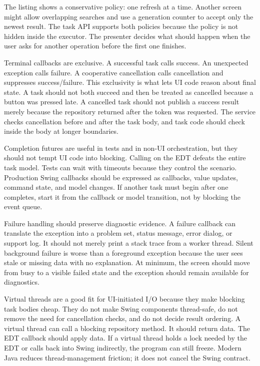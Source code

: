 The listing shows a conservative policy: one refresh at a time. Another screen
might allow overlapping searches and use a generation counter to accept only
the newest result. The task API supports both policies because the policy is
not hidden inside the executor. The presenter decides what should happen when
the user asks for another operation before the first one finishes.

Terminal callbacks are exclusive. A successful task calls success. An
unexpected exception calls failure. A cooperative cancellation calls
cancellation and suppresses success/failure. This exclusivity is what lets UI
code reason about final state. A task should not both succeed and then be
treated as cancelled because a button was pressed late. A cancelled task should
not publish a success result merely because the repository returned after the
token was requested. The service checks cancellation before and after the task
body, and task code should check inside the body at longer boundaries.

Completion futures are useful in tests and in non-UI orchestration, but they
should not tempt UI code into blocking. Calling  on the
EDT defeats the entire task model. Tests can wait with timeouts because they
control the scenario. Production Swing callbacks should be expressed as
callbacks, value updates, command state, and model changes. If another task
must begin after one completes, start it from the callback or model transition,
not by blocking the event queue.

Failure handling should preserve diagnostic evidence. A failure callback can
translate the exception into a problem set, status message, error dialog, or
support log. It should not merely print a stack trace from a worker thread.
Silent background failure is worse than a foreground exception because the
user sees stale or missing data with no explanation. At minimum, the screen
should move from busy to a visible failed state and the exception should remain
available for diagnostics.

Virtual threads are a good fit for UI-initiated I/O because they make blocking
task bodies cheap. They do not make Swing components thread-safe, do not remove
the need for cancellation checks, and do not decide result ordering. A virtual
thread can call a blocking repository method. It should return data. The EDT
callback should apply data. If a virtual thread holds a lock needed by the EDT
or calls back into Swing indirectly, the program can still freeze. Modern Java
reduces thread-management friction; it does not cancel the Swing contract.

